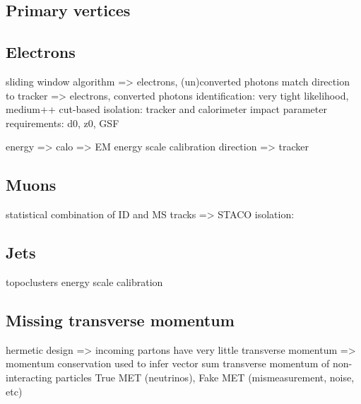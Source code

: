 
\subsection{Primary vertices}
\label{sec:objects:vertices}



\subsection{Electrons}
\label{sec:objects:electrons}

sliding window algorithm => electrons, (un)converted photons
match direction to tracker => electrons, converted photons
identification: very tight likelihood, medium++ cut-based
isolation: tracker and calorimeter
impact parameter requirements: d0, z0, GSF

energy => calo => EM energy scale calibration
direction => tracker



\subsection{Muons}
\label{sec:objects:muons}

statistical combination of ID and MS tracks => STACO
isolation: 



\subsection{Jets}
\label{sec:objects:jets}

topoclusters
energy scale calibration



\subsection{Missing transverse momentum}
\label{sec:objects:met}

hermetic design => incoming partons have very little transverse momentum => momentum conservation used to infer vector sum transverse momentum of non-interacting particles
True MET (neutrinos), Fake MET (mismeasurement, noise, etc)
